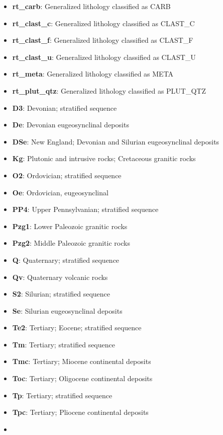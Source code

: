 \documentclass[
]{article}
\providecommand{\tightlist}{%
  \setlength{\itemsep}{0pt}\setlength{\parskip}{0pt}}
\begin{document}
\begin{itemize}
\tightlist
\item
  \textbf{rt\_carb}: Generalized lithology classified as CARB
\item
  \textbf{rt\_clast\_c}: Generalized lithology classified as CLAST\_C
\item
  \textbf{rt\_clast\_f}: Generalized lithology classified as CLAST\_F
\item
  \textbf{rt\_clast\_u}: Generalized lithology classified as CLAST\_U
\item
  \textbf{rt\_meta}: Generalized lithology classified as META
\item
  \textbf{rt\_plut\_qtz}: Generalized lithology classified as PLUT\_QTZ
\item
  \textbf{D3}: Devonian; stratified sequence
\item
  \textbf{De}: Devonian eugeosynclinal deposits
\item
  \textbf{DSe}: New England; Devonian and Silurian eugeosynclinal
  deposits
\item
  \textbf{Kg}: Plutonic and intrusive rocks; Cretaceous granitic rocks
\item
  \textbf{O2}: Ordovician; stratified sequence
\item
  \textbf{Oe}: Ordovician, eugeosynclinal
\item
  \textbf{PP4}: Upper Pennsylvanian; stratified sequence
\item
  \textbf{Pzg1}: Lower Paleozoic granitic rocks
\item
  \textbf{Pzg2}: Middle Paleozoic granitic rocks
\item
  \textbf{Q}: Quaternary; stratified sequence
\item
  \textbf{Qv}: Quaternary volcanic rocks
\item
  \textbf{S2}: Silurian; stratified sequence
\item
  \textbf{Se}: Silurian eugeosynclinal deposits
\item
  \textbf{Te2}: Tertiary; Eocene; stratified sequence
\item
  \textbf{Tm}: Tertiary; stratified sequence
\item
  \textbf{Tmc}: Tertiary; Miocene continental deposits
\item
  \textbf{Toc}: Tertiary; Oligocene continental deposits
\item
  \textbf{Tp}: Tertiary; stratified sequence
\item
  \textbf{Tpc}: Tertiary; Pliocene continental deposits
\item

\end{itemize}
\end{document}
